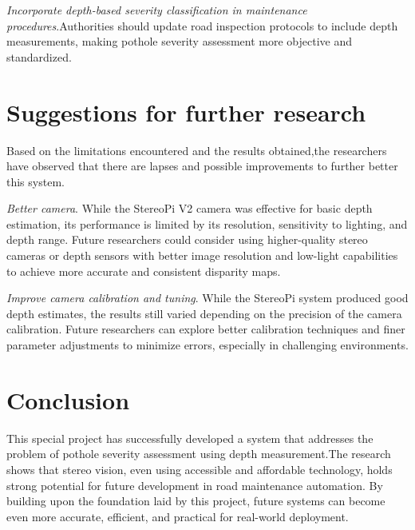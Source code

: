 \textit{Incorporate depth-based severity classification in maintenance procedures}.Authorities should update road inspection protocols to include depth measurements, making pothole severity assessment more objective and standardized.


\section{Suggestions for further research}

Based on the limitations encountered and the results obtained,the researchers have
observed that there are lapses and possible improvements to further better this system.

\textit{Better camera}. While the StereoPi V2 camera was effective for basic depth estimation, its performance is limited by its resolution, sensitivity to lighting, and depth range. Future researchers could consider using higher-quality stereo cameras or depth sensors with better image resolution and low-light capabilities to achieve more accurate and consistent disparity maps.
	
\textit{Improve camera calibration and tuning}. While the StereoPi system produced good depth estimates, the results still varied depending on the precision of the camera calibration. Future researchers can explore better calibration techniques and finer parameter adjustments to minimize errors, especially in challenging environments.


\section{Conclusion}
This special project has successfully developed a system that addresses the problem of pothole severity assessment using depth measurement.The research shows that stereo vision, even using accessible and affordable technology, holds strong potential for future development in road maintenance automation. By building upon the foundation laid by this project, future systems can become even more accurate, efficient, and practical for real-world deployment.